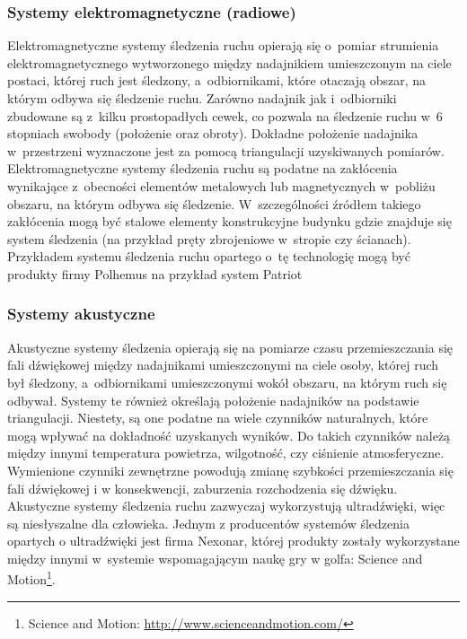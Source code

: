 \subsubsection*{Systemy elektromagnetyczne (radiowe)}
Elektromagnetyczne systemy śledzenia ruchu opierają się o~pomiar strumienia elektromagnetycznego wytworzonego między nadajnikiem umieszczonym na ciele postaci, której ruch jest śledzony, a~odbiornikami, które otaczają obszar, na którym odbywa się śledzenie ruchu. Zarówno nadajnik jak i~odbiorniki zbudowane są z~kilku prostopadłych cewek, co pozwala na śledzenie ruchu w~6 stopniach swobody (położenie oraz obroty). Dokładne położenie nadajnika w~przestrzeni wyznaczone jest za pomocą triangulacji uzyskiwanych pomiarów. Elektromagnetyczne systemy śledzenia ruchu są podatne na zakłócenia wynikające z~obecności elementów metalowych lub magnetycznych w~pobliżu obszaru, na którym odbywa się śledzenie. W~szczególności źródłem  takiego zakłócenia mogą być stalowe elementy konstrukcyjne budynku gdzie znajduje się system śledzenia (na przykład pręty zbrojeniowe w~stropie czy ścianach). Przykładem systemu śledzenia ruchu opartego o~tę technologię mogą być produkty firmy Polhemus na przykład system Patriot
									
\subsubsection*{Systemy akustyczne}
Akustyczne systemy śledzenia opierają się na pomiarze czasu przemieszczania się fali dźwiękowej między nadajnikami umieszczonymi na ciele osoby, której ruch był śledzony, a~odbiornikami umieszczonymi wokół obszaru, na którym ruch się odbywał. Systemy te również określają położenie nadajników na podstawie triangulacji. Niestety, są one podatne na wiele czynników naturalnych, które mogą wpływać na dokładność uzyskanych wyników. Do takich czynników należą między innymi temperatura powietrza, wilgotność, czy ciśnienie atmosferyczne. Wymienione czynniki zewnętrzne powodują zmianę szybkości przemieszczania się fali dźwiękowej i w konsekwencji, zaburzenia rozchodzenia się dźwięku. Akustyczne systemy śledzenia ruchu zazwyczaj wykorzystują ultradźwięki, więc są niesłyszalne dla człowieka. Jednym z producentów systemów śledzenia opartych o ultradźwięki jest firma Nexonar, której produkty zostały wykorzystane między innymi w~systemie wspomagającym naukę gry w golfa: Science and Motion\footnote{Science and Motion: \url{http://www.scienceandmotion.com/}}.
									
